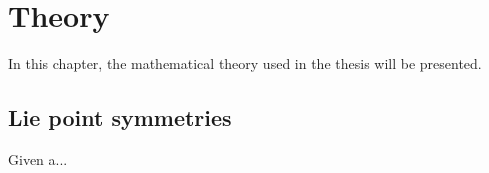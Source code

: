 \chapter{Theory}
%
In this chapter, the mathematical theory used in the thesis will be presented.
%
%
\section{Lie point symmetries}
%
Given a...